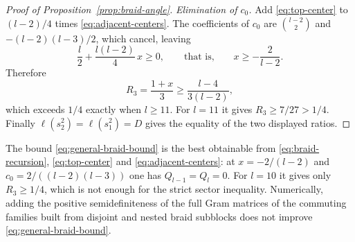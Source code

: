 \begin{proof}[Proof of Proposition~\ref{prop:braid-angle}]
\emph{Elimination of $c_0$.}
Add \eqref{eq:top-center} to $(l-2)/4$ times
\eqref{eq:adjacent-centers}.  The coefficients of $c_0$ are
$\binom{l-2}{2}$ and $-(l-2)(l-3)/2$, which cancel, leaving
\[
 \frac l2+\frac{l(l-2)}{4}\,x\ge0,\qquad\text{that is,}\qquad
 x\ge-\frac{2}{l-2}.
\]
Therefore
\begin{equation}\label{eq:general-braid-bound}
 R_3=\frac{1+x}{3}\ge\frac{l-4}{3(l-2)},
\end{equation}
which exceeds $1/4$ exactly when $l\ge11$.  For $l=11$ it gives
$R_3\ge 7/27>1/4$.  Finally $\ell(s_2^2)=\ell(s_1^2)=D$ gives the
equality of the two displayed ratios.
\end{proof}

\begin{remark}
The bound \eqref{eq:general-braid-bound} is the best obtainable from
\eqref{eq:braid-recursion}, \eqref{eq:top-center} and
\eqref{eq:adjacent-centers}: at $x=-2/(l-2)$ and
$c_0=2/((l-2)(l-3))$ one has $Q_{l-1}=Q_l=0$.  For $l=10$ it gives only
$R_3\ge1/4$, which is not enough for the strict sector inequality.
Numerically, adding the positive semidefiniteness of the full Gram
matrices of the commuting families built from disjoint and nested
braid subblocks does not improve \eqref{eq:general-braid-bound}.
\end{remark}

